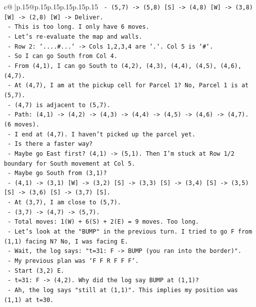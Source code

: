 \documentclass{article}
\begin{document}
{\begin{supertabular}{c@{$\;$}|p{.15\linewidth}@{}p{.15\linewidth}p{.15\linewidth}p{.15\linewidth}p{.15\linewidth}p{.15\linewidth}}
{{{\texttt{     {-} (5,7) {-}> (5,8) {[}S{]} {-}> (4,8) {[}W{]} {-}> (3,8) {[}W{]} {-}> (2,8) {[}W{]} {-}> Deliver.} \\
\texttt{   {-} This is too long. I only have 6 moves.} \\
\texttt{   {-} Let's re{-}evaluate the map and walls.} \\
\texttt{   {-} Row 2: `....\#...` {-}> Cols 1,2,3,4 are `.`. Col 5 is `\#`.} \\
\texttt{   {-} So I can go South from Col 4.} \\
\texttt{   {-} From (4,1), I can go South to (4,2), (4,3), (4,4), (4,5), (4,6), (4,7).} \\
\texttt{   {-} At (4,7), I am at the pickup cell for Parcel 1? No, Parcel 1 is at (5,7).} \\
\texttt{   {-} (4,7) is adjacent to (5,7).} \\
\texttt{   {-} Path: (4,1) {-}> (4,2) {-}> (4,3) {-}> (4,4) {-}> (4,5) {-}> (4,6) {-}> (4,7). (6 moves).} \\
\texttt{   {-} I end at (4,7). I haven't picked up the parcel yet.} \\
\texttt{   {-} Is there a faster way?} \\
\texttt{   {-} Maybe go East first? (4,1) {-}> (5,1). Then I'm stuck at Row 1/2 boundary for South movement at Col 5.} \\
\texttt{   {-} Maybe go South from (3,1)?} \\
\texttt{     {-} (4,1) {-}> (3,1) {[}W{]} {-}> (3,2) {[}S{]} {-}> (3,3) {[}S{]} {-}> (3,4) {[}S{]} {-}> (3,5) {[}S{]} {-}> (3,6) {[}S{]} {-}> (3,7) {[}S{]}.} \\
\texttt{     {-} At (3,7), I am close to (5,7).} \\
\texttt{     {-} (3,7) {-}> (4,7) {-}> (5,7).} \\
\texttt{     {-} Total moves: 1(W) + 6(S) + 2(E) = 9 moves. Too long.} \\
\texttt{   {-} Let's look at the "BUMP" in the previous turn. I tried to go F from (1,1) facing N? No, I was facing E.} \\
\texttt{   {-} Wait, the log says: "t=31: F {-}> BUMP (you ran into the border)".} \\
\texttt{   {-} My previous plan was `F F R F F F`.} \\
\texttt{   {-} Start (3,2) E.} \\
\texttt{   {-} t=31: F {-}> (4,2). Why did the log say BUMP at (1,1)?} \\
\texttt{   {-} Ah, the log says "still at (1,1)". This implies my position was (1,1) at t=30.} \\
}}}
\end{supertabular}}
\end{document}
